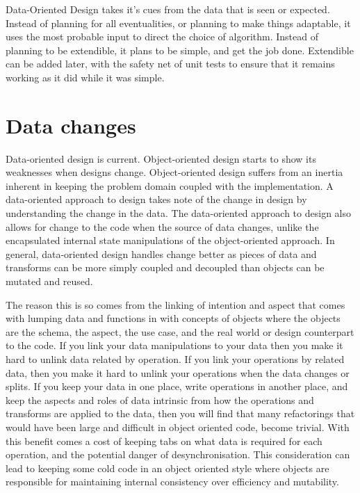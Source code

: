 Data-Oriented Design takes it's cues from the data that is seen or expected.
Instead of planning for all eventualities, or planning to make things
adaptable, it uses the most probable input to direct the choice of algorithm.
Instead of planning to be extendible, it plans to be simple, and get the job
done. Extendible can be added later, with the safety net of unit tests to
ensure that it remains working as it did while it was simple.

\section{Data changes}

Data-oriented design is current. Object-oriented design starts to show its
weaknesses when designs change. Object-oriented design suffers from an inertia
inherent in keeping the problem domain coupled with the implementation. A
data-oriented approach to design takes note of the change in design by
understanding the change in the data. The data-oriented approach to design also
allows for change to the code when the source of data changes, unlike the
encapsulated internal state manipulations of the object-oriented approach. In
general, data-oriented design handles change better as pieces of data and
transforms can be more simply coupled and decoupled than objects can be mutated
and reused.

The reason this is so comes from the linking of intention and aspect that comes
with lumping data and functions in with concepts of objects where the objects
are the schema, the aspect, the use case, and the real world or design
counterpart to the code. If you link your data manipulations to your data then
you make it hard to unlink data related by operation. If you link your
operations by related data, then you make it hard to unlink your operations
when the data changes or splits. If you keep your data in one place, write
operations in another place, and keep the aspects and roles of data intrinsic
from how the operations and transforms are applied to the data, then you will
find that many refactorings that would have been large and difficult in object
oriented code, become trivial. With this benefit comes a cost of keeping tabs
on what data is required for each operation, and the potential danger of
desynchronisation.  This consideration can lead to keeping some cold code in an
object oriented style where objects are responsible for maintaining internal
consistency over efficiency and mutability.

